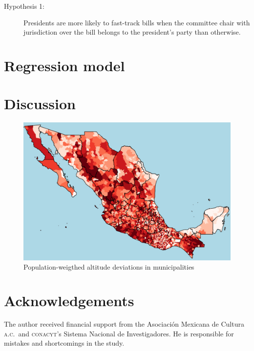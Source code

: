 \documentclass[letter,12pt]{article}
\begin{document}
\begin{description}
  \item [Hypothesis 1:] Presidents are more likely to fast-track bills when the committee chair with jurisdiction over the bill  belongs to the president's party than otherwise.
\end{description}

\section{Regression model}

\section{Discussion}

\begin{figure}
  \centering
    \caption{Population-weigthed altitude deviations in municipalities}\label{F:avgMg}
    \includegraphics[width=.8\columnwidth]{../graph/map.png}
\end{figure}


\section*{Acknowledgements}
The author received financial support from the Asociaci\'on Mexicana de Cultura \textsc{a.c.}\ and \textsc{conacyt}'s Sistema Nacional de Investigadores. He is responsible for mistakes and shortcomings in the study.




\end{document}
